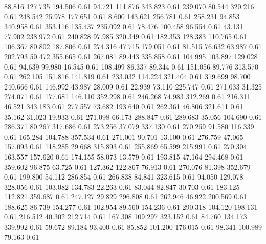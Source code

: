   88.816  127.735  194.506         0.61
  94.721  111.876  343.823         0.61
 239.070   80.544  320.216         0.61
 248.542   25.978  177.651         0.61
   8.600  143.621  256.781         0.61
 258.231   94.853  340.958         0.61
 353.116  135.437  235.092         0.61
  78.476  100.458   96.554         0.61
  43.131   77.902  238.972         0.61
 240.828   97.985  320.349         0.61
 182.353  128.383  110.765         0.61
 106.367   80.802  187.806         0.61
 274.316   47.715  179.051         0.61
  81.515   76.632   63.987         0.61
 202.793   50.472  355.665         0.61
 267.081   89.443  335.858         0.61
 104.995  103.897  129.028         0.61
  94.639   99.980   16.545         0.61
 108.499   86.337   89.344         0.61
 151.056   89.776  313.570         0.61
 262.105  151.816  141.819         0.61
 233.032  114.224  321.404         0.61
 319.699   98.700  240.666         0.61
 146.992   43.987   28.009         0.61
  22.939   73.110  225.747         0.61
 271.033   31.325  274.071         0.61
 177.681  146.110  352.298         0.61
 246.268   74.983  312.269         0.61
 216.311   46.521  343.183         0.61
 277.557   73.682  193.640         0.61
 262.361   46.806  321.611         0.61
  35.162   31.023   19.933         0.61
 271.098   66.173  288.847         0.61
 289.683   35.056  104.690         0.61
 286.371   80.267  317.686         0.61
 273.256   37.079  337.130         0.61
 270.259   91.580  116.339         0.61
 165.284  104.788  357.534         0.61
 271.001   90.701   13.100         0.61
 276.759   47.065  157.093         0.61
 118.285   29.668  315.893         0.61
 255.869   65.599  215.991         0.61
 270.304  163.557  157.620         0.61
 174.155   58.073   13.579         0.61
 193.815   47.164  294.468         0.61
 359.602   96.875   63.725         0.61
 127.362  122.867   76.913         0.61
 270.076   81.398  352.679         0.61
 199.800   54.112  286.854         0.61
 266.838   84.841  323.615         0.61
  94.050  129.078  328.056         0.61
 103.082  134.783   22.263         0.61
  83.044   82.847   30.703         0.61
 183.125  112.821  359.687         0.61
 247.127   29.829  296.808         0.61
 262.946   46.922  200.569         0.61
 188.625   86.739  154.277         0.61
 102.954   89.560  154.236         0.61
 290.318  104.120  198.131         0.61
 216.512   40.302  212.714         0.61
 167.308  109.297  323.152         0.61
  84.760  134.173  339.992         0.61
  59.672   89.184   93.400         0.61
  85.852  101.200  176.015         0.61
  98.341  100.989   79.163         0.61
